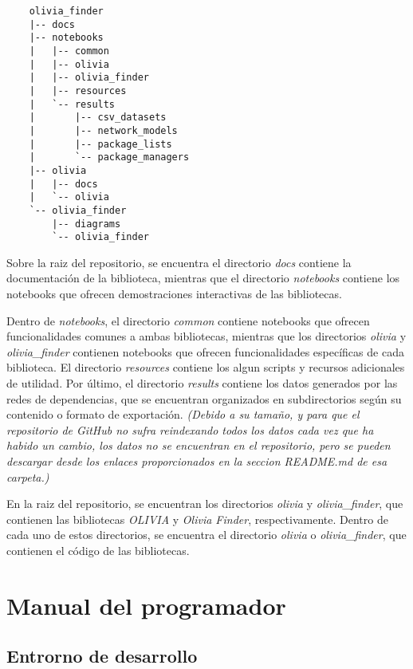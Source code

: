 \begin{verbatim}
    olivia_finder
    |-- docs
    |-- notebooks
    |   |-- common
    |   |-- olivia
    |   |-- olivia_finder
    |   |-- resources
    |   `-- results
    |       |-- csv_datasets
    |       |-- network_models
    |       |-- package_lists
    |       `-- package_managers
    |-- olivia
    |   |-- docs
    |   `-- olivia
    `-- olivia_finder
        |-- diagrams
        `-- olivia_finder
    \end{verbatim}


Sobre la raiz del repositorio, se encuentra el directorio \textit{docs} contiene la documentación de la biblioteca, mientras que el directorio \textit{notebooks}
contiene los notebooks que ofrecen demostraciones interactivas de las bibliotecas.

Dentro de \textit{notebooks}, el directorio \textit{common} contiene notebooks que ofrecen funcionalidades comunes
a ambas bibliotecas, mientras que los directorios \textit{olivia} y \textit{olivia\_finder} contienen notebooks
que ofrecen funcionalidades específicas de cada biblioteca.
El directorio \textit{resources} contiene los algun scripts
y recursos adicionales de utilidad. Por último, el directorio \textit{results} contiene los datos generados por las
redes de dependencias, que se encuentran organizados en subdirectorios según su contenido o formato de exportación. \textit{(Debido a su tamaño, y para que el repositorio de 
GitHub no sufra reindexando todos los datos cada vez que ha habido un cambio, los datos no se encuentran en el repositorio, pero se pueden descargar desde 
los enlaces proporcionados en la seccion README.md de esa carpeta.)}

En la raiz del repositorio, se encuentran los directorios \textit{olivia} y \textit{olivia\_finder}, que contienen
las bibliotecas \textit{OLIVIA} y \textit{Olivia Finder}, respectivamente. Dentro de cada uno de estos directorios, se encuentra
el directorio \textit{olivia} o \textit{olivia\_finder}, que contienen el código de las bibliotecas.


\section{Manual del programador}

\subsection{Entrorno de desarrollo}

